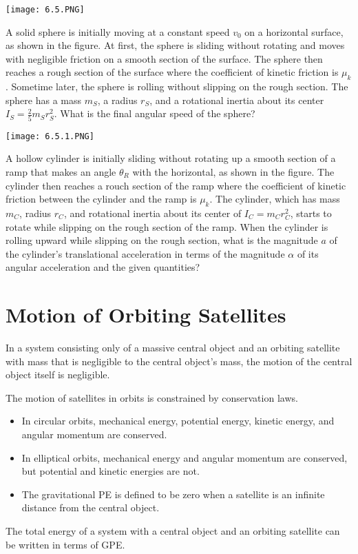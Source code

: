 \documentclass[../mech.tex]{subfiles}
\begin{document}
\ex \begin{center}
    \texttt{[image: 6.5.PNG]}
\end{center}
A solid sphere is initially moving at a constant speed $v_0$ on a horizontal surface, as shown in the figure. At first, the sphere is sliding without rotating and moves with negligible friction on a smooth section of the surface. The sphere then reaches a rough section of the surface 
where the coefficient of kinetic friction is $\mu_k$. Sometime later, the sphere is rolling without slipping on the rough section. The sphere has a mass $m_S$, a radius $r_S$, and a rotational inertia about its center $I_S=\frac{2}{5}m_Sr_S^2$. What is the final angular speed of the sphere?

\pagebreak
\ex \begin{center}
    \texttt{[image: 6.5.1.PNG]}
\end{center}
A hollow cylinder is initially sliding without rotating up a smooth section of a ramp that makes an angle $\theta_R$ with the horizontal, as shown in the figure. The cylinder then reaches a rouch section of the ramp where the coefficient of kinetic friction between the cylinder and the ramp is $\mu_k$. 
The cylinder, which has mass $m_C$, radius $r_C$, and rotational inertia about its center of $I_C=m_Cr_C^2$, starts to rotate while slipping on the rough section of the ramp. When the cylinder is rolling upward while slipping on the rough section, what is the magnitude $a$ of the cylinder's translational acceleration in terms of the magnitude $\alpha$ of its angular acceleration and the given quantities?

\section{Motion of Orbiting Satellites}
In a system consisting only of a massive central object and an orbiting satellite with mass that is negligible to the central object's mass, the motion of the central object itself is negligible.

The motion of satellites in orbits is constrained by conservation laws.
\begin{itemize}
    \item In circular orbits, mechanical energy, potential energy, kinetic energy, and angular momentum are conserved.
    \item In elliptical orbits, mechanical energy and angular momentum are conserved, but potential and kinetic energies are not.
    \item The gravitational PE is defined to be zero when a satellite is an infinite distance from the central object.
\end{itemize}
The total energy of a system with a central object and an orbiting satellite can be written in terms of GPE.
\end{document}
